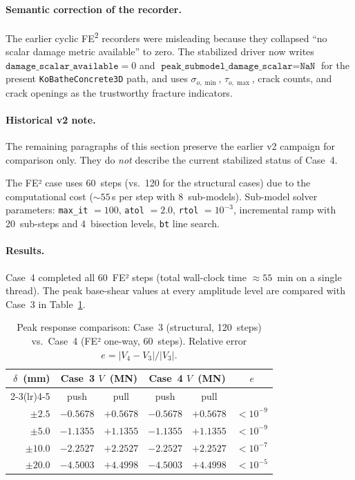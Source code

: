 \paragraph{Semantic correction of the recorder.}
The earlier cyclic FE\textsuperscript{2} recorders were misleading because they
collapsed ``no scalar damage metric available'' to zero.  The stabilized
driver now writes
\(\texttt{damage\_scalar\_available} = 0\) and
\(\texttt{peak\_submodel\_damage\_scalar} = \texttt{NaN}\) for the present
\texttt{KoBatheConcrete3D} path, and uses \(\sigma_{o,\min}\),
\(\tau_{o,\max}\), crack counts, and crack openings as the trustworthy
fracture indicators.

\paragraph{Historical v2 note.}
The remaining paragraphs of this section preserve the earlier v2 campaign for
comparison only.  They do \emph{not} describe the current stabilized status of
Case~4.

The FE² case uses 60~steps (vs.~120 for the structural cases) due
to the computational cost ($\sim 55$\,s per step with 8~sub-models).
Sub-model solver parameters: \texttt{max\_it} $= 100$,
\texttt{atol} $= 2.0$, \texttt{rtol} $= 10^{-3}$, incremental ramp
with 20~sub-steps and 4~bisection levels, \texttt{bt} line search.

\paragraph{Results.}
Case~4 completed all 60~FE² steps (total wall-clock time
$\approx 55$~min on a single thread).  The peak base-shear values
at every amplitude level are compared with Case~3 in Table~\ref{tab:case4-peaks}.

\begin{table}[htbp]
\centering
\caption{Peak response comparison: Case~3 (structural, 120~steps)
  vs.\ Case~4 (FE² one-way, 60~steps).  Relative error
  $e = |V_4 - V_3|/|V_3|$.}
\label{tab:case4-peaks}
\begin{tabular}{rccccc}
\toprule
$\delta$~(mm)
  & \multicolumn{2}{c}{Case~3 $V$~(MN)}
  & \multicolumn{2}{c}{Case~4 $V$~(MN)}
  & $e$ \\
\cmidrule(lr){2-3}\cmidrule(lr){4-5}
  & push & pull & push & pull & \\
\midrule
$\pm 2.5$  & $-0.5678$ & $+0.5678$ & $-0.5678$ & $+0.5678$ & $< 10^{-9}$ \\
$\pm 5.0$  & $-1.1355$ & $+1.1355$ & $-1.1355$ & $+1.1355$ & $< 10^{-9}$ \\
$\pm 10.0$ & $-2.2527$ & $+2.2527$ & $-2.2527$ & $+2.2527$ & $< 10^{-7}$ \\
$\pm 20.0$ & $-4.5003$ & $+4.4998$ & $-4.5003$ & $+4.4998$ & $< 10^{-5}$ \\
\bottomrule
\end{tabular}
\end{table}

